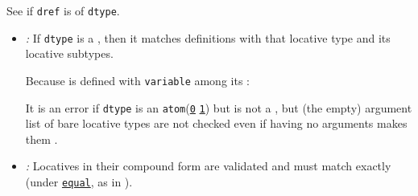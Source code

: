 \begin{itemize}
  See if \texttt{dref} is of \texttt{dtype}.

  \begin{itemize}
  \item
    \emph{:} If \texttt{dtype} is a
    , then it matches definitions with that locative type
    and its locative subtypes.

    Because
    is defined with \texttt{variable} among its
    :

\begin{Shaded}
\begin{Highlighting}[]
 \NormalTok{) }\NormalTok{)}
\OperatorTok{=\textgreater{}}
\end{Highlighting}
\end{Shaded}

\begin{Shaded}
\begin{Highlighting}[]
 \NormalTok{) }\NormalTok{)}
\OperatorTok{=\textgreater{}}
\end{Highlighting}
\end{Shaded}

    It is an error if \texttt{dtype} is an
    \texttt{atom}(\href{http://www.lispworks.com/documentation/HyperSpec/Body/f_atom.htm}{\texttt{0}}
    \href{http://www.lispworks.com/documentation/HyperSpec/Body/t_atom.htm}{\texttt{1}})
    but is not a
    , but (the empty) argument list of bare locative types
    are not checked even if having no arguments makes them
    .
  \item
    \emph{:} Locatives in their compound form are validated
    and must match exactly (under
    \href{http://www.lispworks.com/documentation/HyperSpec/Body/f_equal.htm}{\texttt{equal}},
    as in ).


\end{itemize}
\end{itemize}
